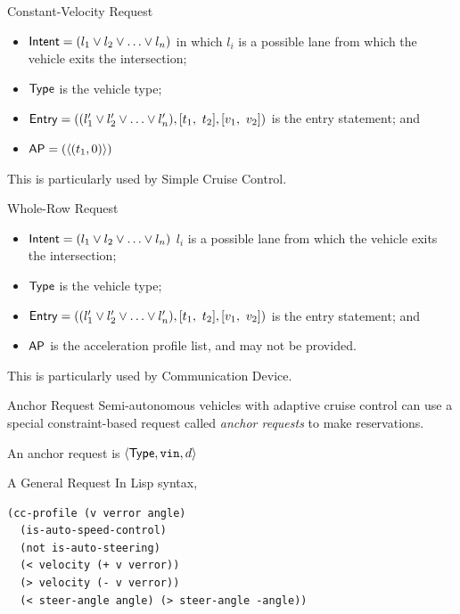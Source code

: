 \documentclass{beamer}
\begin{document}
\begin{frame}{Constant-Velocity Request}
\begin{itemize}
\item ${\sf Intent} = ( l_1 \vee l_2 \vee \ldots \vee l_n )$
in which $l_i$ is a possible lane from which the vehicle 
exits the intersection;
\item ${\sf Type}$ is the vehicle type;
\item ${\sf Entry} = (( l'_1 \vee l'_2 \vee \ldots \vee l'_n ), [t_1,\ t_2], [v_1,\ v_2])$
is the entry statement; and
\item ${\sf AP} = ( \langle (t_1, 0) \rangle )$
\end{itemize}

This is particularly used by Simple Cruise Control.
\end{frame}

\begin{frame}{Whole-Row Request}
\begin{itemize}
\item ${\sf Intent} = ( l_1 \vee l_2 \vee \ldots \vee l_n )$ $l_i$ is a possible lane from which the vehicle exits the intersection;
\item ${\sf Type}$ is the vehicle type;
\item ${\sf Entry} = (( l'_1 \vee l'_2 \vee \ldots \vee l'_n ), [t_1,\ t_2], [v_1,\ v_2])$ is the entry statement; and
\item ${\sf AP}$ is the acceleration profile list, and may not be
provided.
\end{itemize}

This is particularly used by Communication Device.
\end{frame}

\begin{frame}{Anchor Request}
Semi-autonomous vehicles with adaptive cruise control can use a special
constraint-based request called \emph{anchor requests} to make
reservations.\pause

\hfill

An anchor request is $\langle {\sf Type}, \texttt{vin},
d \rangle$
\end{frame}

\begin{frame}[fragile]{A General Request}
In Lisp syntax,

\begin{small}
\begin{verbatim}
(cc-profile (v verror angle)
  (is-auto-speed-control)
  (not is-auto-steering)
  (< velocity (+ v verror))
  (> velocity (- v verror))
  (< steer-angle angle) (> steer-angle -angle))
\end{verbatim}
\end{small}
\end{frame}
\end{document}
